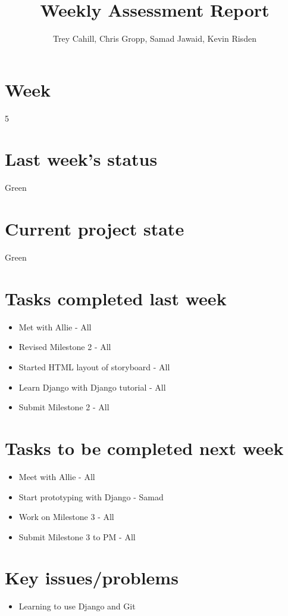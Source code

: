 \documentclass{article}
\title{Weekly Assessment Report}
\author{Trey Cahill, Chris Gropp, Samad Jawaid, Kevin Risden}
\begin{document}
\maketitle
\section{Week}
5
\section{Last week's status}
Green
\section{Current project state}
Green
\section{Tasks completed last week}
\begin{itemize}
\item Met with Allie - All
\item Revised Milestone 2 - All
\item Started HTML layout of storyboard - All
\item Learn Django with Django tutorial - All
\item Submit Milestone 2 - All
\end{itemize}
\section{Tasks to be completed next week}
\begin{itemize}
\item Meet with Allie - All
\item Start prototyping with Django - Samad
\item Work on Milestone 3 - All
\item Submit Milestone 3 to PM - All
\end{itemize}
\section{Key issues/problems}
\begin{itemize}
\item Learning to use Django and Git
\end{itemize}
\end{document}
